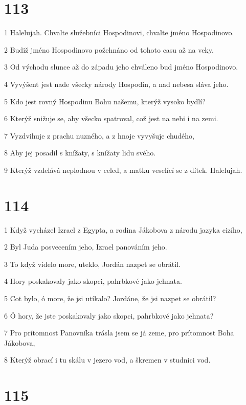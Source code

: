 \chapter{113}

\par 1 Halelujah. Chvalte služebníci Hospodinovi, chvalte jméno Hospodinovo.
\par 2 Budiž jméno Hospodinovo požehnáno od tohoto casu až na veky.
\par 3 Od východu slunce až do západu jeho chváleno bud jméno Hospodinovo.
\par 4 Vyvýšent jest nade všecky národy Hospodin, a nad nebesa sláva jeho.
\par 5 Kdo jest rovný Hospodinu Bohu našemu, kterýž vysoko bydlí?
\par 6 Kterýž snižuje se, aby všecko spatroval, což jest na nebi i na zemi.
\par 7 Vyzdvihuje z prachu nuzného, a z hnoje vyvyšuje chudého,
\par 8 Aby jej posadil s knížaty, s knížaty lidu svého.
\par 9 Kterýž vzdelává neplodnou v celed, a matku veselící se z dítek. Halelujah.

\chapter{114}

\par 1 Když vycházel Izrael z Egypta, a rodina Jákobova z národu jazyka cizího,
\par 2 Byl Juda posvecením jeho, Izrael panováním jeho.
\par 3 To když videlo more, uteklo, Jordán nazpet se obrátil.
\par 4 Hory poskakovaly jako skopci, pahrbkové jako jehnata.
\par 5 Cot bylo, ó more, že jsi utíkalo? Jordáne, že jsi nazpet se obrátil?
\par 6 Ó hory, že jste poskakovaly jako skopci, pahrbkové jako jehnata?
\par 7 Pro prítomnost Panovníka trásla jsem se já zeme, pro prítomnost Boha Jákobova,
\par 8 Kterýž obrací i tu skálu v jezero vod, a škremen v studnici vod.

\chapter{115}

